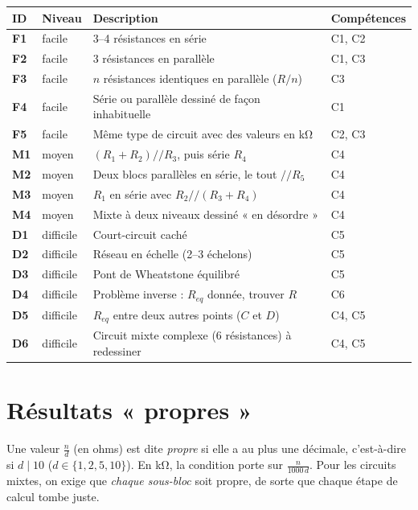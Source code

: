 \documentclass[11pt,a4paper]{report}
\newcommand{\req}{R_{eq}}
\newcommand{\para}{\mathbin{/\!/}}
\begin{document}
\begin{center}
\small
\begin{tabularx}{\textwidth}{>{\bfseries}l l X l}
  \toprule
  ID & Niveau & Description & Compétences \\
  \midrule
  F1 & facile & 3--4 résistances en série & C1, C2 \\
  F2 & facile & 3 résistances en parallèle & C1, C3 \\
  F3 & facile & $n$ résistances identiques en parallèle ($R/n$) & C3 \\
  F4 & facile & Série ou parallèle dessiné de façon inhabituelle & C1 \\
  F5 & facile & Même type de circuit avec des valeurs en \si{\kilo\ohm} & C2, C3 \\
  \midrule
  M1 & moyen & $(R_1 + R_2) \para R_3$, puis série $R_4$ & C4 \\
  M2 & moyen & Deux blocs parallèles en série, le tout $\para R_5$ & C4 \\
  M3 & moyen & $R_1$ en série avec $R_2 \para (R_3 + R_4)$ & C4 \\
  M4 & moyen & Mixte à deux niveaux dessiné « en désordre » & C4 \\
  \midrule
  D1 & difficile & Court-circuit caché & C5 \\
  D2 & difficile & Réseau en échelle (2--3 échelons) & C5 \\
  D3 & difficile & Pont de Wheatstone équilibré & C5 \\
  D4 & difficile & Problème inverse : $\req$ donnée, trouver $R$ & C6 \\
  D5 & difficile & $\req$ entre deux autres points ($C$ et $D$) & C4, C5 \\
  D6 & difficile & Circuit mixte complexe (6 résistances) à redessiner & C4, C5 \\
  \bottomrule
\end{tabularx}
\end{center}

\section{Résultats « propres »}
Une valeur $\frac{n}{d}$ (en ohms) est dite \emph{propre} si elle a au plus une décimale, c'est-à-dire si $d \mid 10$ ($d \in \{1, 2, 5, 10\}$). En \si{\kilo\ohm}, la condition porte sur $\frac{n}{1000\,d}$. Pour les circuits mixtes, on exige que \emph{chaque sous-bloc} soit propre, de sorte que chaque étape de calcul tombe juste.
\end{document}
